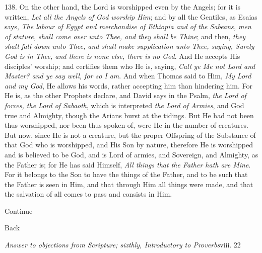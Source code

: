 138. On the other hand, the
Lord is worshipped even by the Angels; for it is written, \emph{Let all
the Angels of God worship Him}; and by all the Gentiles, as Esaias
says, \emph{The labour of Egypt and merchandise of Ethiopia and of the
Sabeans, men of stature, shall come over unto Thee, and they shall be
Thine}; and then, \emph{they shall fall down unto Thee, and shall make
supplication unto Thee, saying, Surely God is in Thee, and there is
none else, there is no God}. And He accepts His disciples' worship;
and certifies them who He is, saying, \emph{Call ye Me not Lord and
Master? and ye say well, for so I am}. And when Thomas said to Him,
\emph{My Lord and my God}, He allows his words, rather accepting him
than hindering him. For He is, as the other Prophets declare, and
David says in the Psalm, \emph{the Lord of forces, the Lord of Sabaoth},
which is interpreted \emph{the Lord of Armies}, and God true and
Almighty, though the Arians burst at the tidings. But He had not been
thus worshipped, nor been thus spoken of, were He in the number of
creatures. But now, since He is not a creature, but the proper
Offspring of the Substance of that God who is worshipped, and His Son
by nature, therefore He is worshipped and is believed to be God, and
is Lord of armies, and Sovereign, and Almighty, as the Father is; for
He has said Himself, \emph{All things that the Father hath are Mine}.
For it belongs to the Son to have the things of the Father, and to be
such that the Father is seen in Him, and that through Him all things
were made, and that the salvation of all comes to pass and consists in
Him.

Continue

Back


\emph{Answer to
objections from Scripture; sixthly, Introductory to Proverbs}viii.
22

